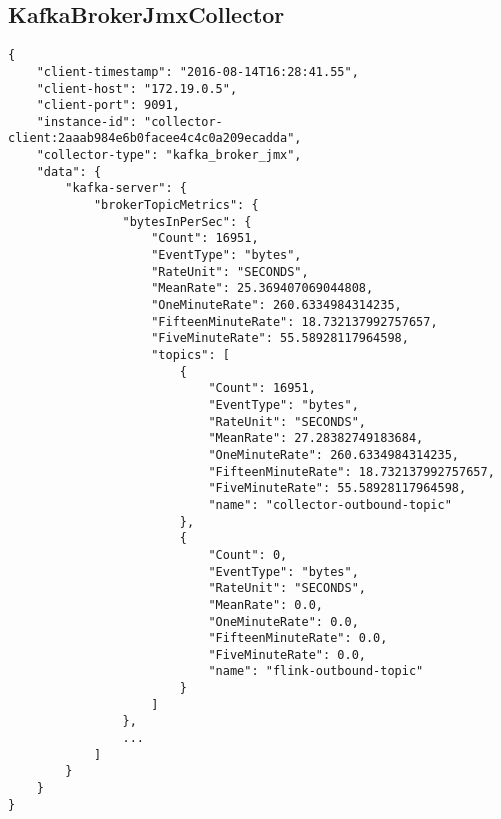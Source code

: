 \subsection{KafkaBrokerJmxCollector}
\begin{lstlisting}[caption={"KafkaBrokerJmxCollector" JSON result, abbreviated}, captionpos=b, label={lst:json-kafka}]
{
    "client-timestamp": "2016-08-14T16:28:41.55",
    "client-host": "172.19.0.5",
    "client-port": 9091,
    "instance-id": "collector-client:2aaab984e6b0facee4c4c0a209ecadda",
    "collector-type": "kafka_broker_jmx",
    "data": {
        "kafka-server": {
            "brokerTopicMetrics": {
                "bytesInPerSec": {
                    "Count": 16951,
                    "EventType": "bytes",
                    "RateUnit": "SECONDS",
                    "MeanRate": 25.369407069044808,
                    "OneMinuteRate": 260.6334984314235,
                    "FifteenMinuteRate": 18.732137992757657,
                    "FiveMinuteRate": 55.58928117964598,
                    "topics": [
                        {
                            "Count": 16951,
                            "EventType": "bytes",
                            "RateUnit": "SECONDS",
                            "MeanRate": 27.28382749183684,
                            "OneMinuteRate": 260.6334984314235,
                            "FifteenMinuteRate": 18.732137992757657,
                            "FiveMinuteRate": 55.58928117964598,
                            "name": "collector-outbound-topic"
                        },
                        {
                            "Count": 0,
                            "EventType": "bytes",
                            "RateUnit": "SECONDS",
                            "MeanRate": 0.0,
                            "OneMinuteRate": 0.0,
                            "FifteenMinuteRate": 0.0,
                            "FiveMinuteRate": 0.0,
                            "name": "flink-outbound-topic"
                        }
                    ]
                },
                ...
            ]
        }
    }
}
\end{lstlisting}

